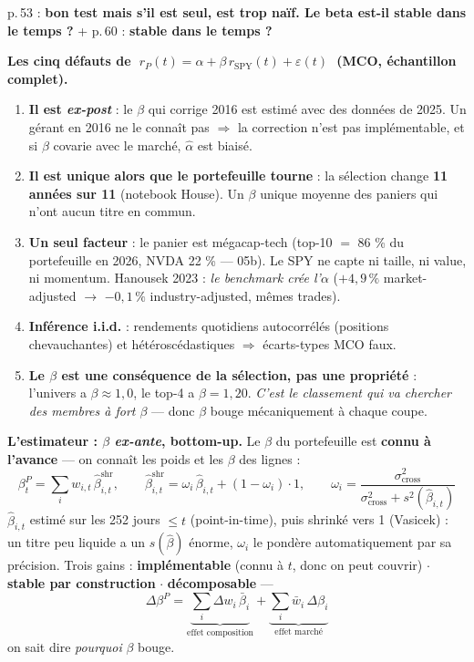 \documentclass[11pt,a4paper]{article}
\newcommand{\remarque}[1]{{\color{rouge}\textbf{\og{} #1 \fg{}}}}
\begin{document}
p.\,53 : \remarque{bon test mais s'il est seul, est trop naïf. Le beta est-il stable dans le temps ?} \;+\; p.\,60 : \remarque{stable dans le temps ?}

\textbf{Les cinq défauts de $\;r_P(t)=\alpha+\beta\,r_{\mathrm{SPY}}(t)+\varepsilon(t)\;$ (MCO, échantillon complet).}
\begin{enumerate}[itemsep=0.8pt, topsep=1pt, leftmargin=7mm]
\item \textbf{Il est \emph{ex-post}} : le $\beta$ qui \og{} corrige \fg{} 2016 est estimé avec des données de 2025. Un gérant en 2016 ne le connaît pas $\Rightarrow$ la correction n'est pas implémentable, et si $\beta$ covarie avec le marché, $\hat\alpha$ est biaisé.
\item \textbf{Il est unique alors que le portefeuille tourne} : la sélection change \textbf{11 années sur 11} (notebook House). Un $\beta$ unique moyenne des paniers qui n'ont aucun titre en commun.
\item \textbf{Un seul facteur} : le panier est mégacap-tech (top-10 $=$ 86 \% du portefeuille en 2026, NVDA 22 \% --- 05b). Le SPY ne capte ni taille, ni value, ni momentum. Hanousek 2023 : \emph{le benchmark crée l'$\alpha$} ($+4{,}9\,\%$ market-adjusted $\to$ $-0{,}1\,\%$ industry-adjusted, mêmes trades).
\item \textbf{Inférence i.i.d.} : rendements quotidiens autocorrélés (positions chevauchantes) et hétéroscédastiques $\Rightarrow$ écarts-types MCO faux.
\item \textbf{Le $\beta$ est une conséquence de la sélection, pas une propriété} : l'univers a $\beta\approx 1{,}0$, le top-4 a $\beta=1{,}20$. \emph{C'est le classement qui va chercher des membres à fort $\beta$} --- donc $\beta$ bouge mécaniquement à chaque coupe.
\end{enumerate}

\textbf{L'estimateur : $\beta$ \emph{ex-ante}, bottom-up.} Le $\beta$ du portefeuille est \textbf{connu à l'avance} --- on connaît les poids et les $\beta$ des lignes :
\[
\beta^{P}_t=\sum_i w_{i,t}\,\hat\beta^{\text{shr}}_{i,t},
\qquad
\hat\beta^{\text{shr}}_{i,t}=\omega_i\,\hat\beta_{i,t}+(1-\omega_i)\cdot 1,
\qquad
\omega_i=\frac{\sigma^2_{\text{cross}}}{\sigma^2_{\text{cross}}+s^2(\hat\beta_{i,t})}
\]
$\hat\beta_{i,t}$ estimé sur les 252 jours \textbf{$\le t$} (point-in-time), puis shrinké vers 1 (Vasicek) : un titre peu liquide a un $s(\hat\beta)$ énorme, $\omega_i$ le pondère automatiquement par sa précision.
Trois gains : \textbf{implémentable} (connu à $t$, donc on peut couvrir) $\cdot$ \textbf{stable par construction} $\cdot$ \textbf{décomposable} ---
\[
\Delta\beta^{P}=\underbrace{\textstyle\sum_i \Delta w_i\,\bar\beta_i}_{\text{effet composition}}+\underbrace{\textstyle\sum_i \bar w_i\,\Delta\beta_i}_{\text{effet marché}}
\]
on sait dire \emph{pourquoi} $\beta$ bouge.
\end{document}
